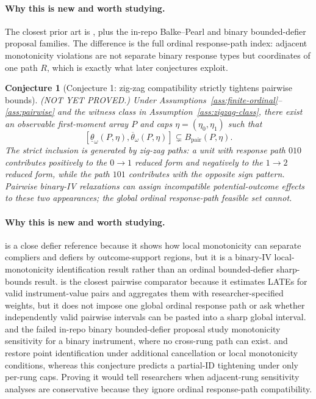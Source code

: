 \documentclass[11pt]{article}
\theoremstyle{definition}
\theoremstyle{plain}
\newtheorem{conjecture}{Conjecture}
\theoremstyle{remark}
\begin{document}
\paragraph{Why this is new and worth studying.}
The closest prior art is \citet{BalkePearl1997}, plus the in-repo Balke--Pearl and binary bounded-defier proposal families.  The difference is the full ordinal response-path index: adjacent monotonicity violations are not separate binary response types but coordinates of one path \(R\), which is exactly what later conjectures exploit.

\begin{conjecture}[Conjecture 1: zig-zag compatibility strictly tightens pairwise bounds]\label{conj:zigzag}
(NOT YET PROVED.)  Under Assumptions~\ref{ass:finite-ordinal}--\ref{ass:pairwise} and the witness class in Assumption~\ref{ass:zigzag-class}, there exist an observable first-moment array \(P\) and caps \(\eta=(\eta_0,\eta_1)\) such that
\[
[\underline\theta_\omega(P,\eta),\overline\theta_\omega(P,\eta)]
\subsetneq B_{\mathrm{pair}}(P,\eta).
\]
The strict inclusion is generated by zig-zag paths: a unit with response path \(010\) contributes positively to the \(0\to1\) reduced form and negatively to the \(1\to2\) reduced form, while the path \(101\) contributes with the opposite sign pattern.  Pairwise binary-IV relaxations can assign incompatible potential-outcome effects to these two appearances; the global ordinal response-path feasible set cannot.
\end{conjecture}
\paragraph{Why this is new and worth studying.}
\citet{HuberMellace2012} is a close defier reference because it shows how local monotonicity can separate compliers and defiers by outcome-support regions, but it is a binary-IV local-monotonicity identification result rather than an ordinal bounded-defier sharp-bounds result.  \citet{SunWuthrich2025} is the closest pairwise comparator because it estimates LATEs for valid instrument-value pairs and aggregates them with researcher-specified weights, but it does not impose one global ordinal response path or ask whether independently valid pairwise intervals can be pasted into a sharp global interval.  \citet{Noack2021} and the failed in-repo binary bounded-defier proposal study monotonicity sensitivity for a binary instrument, where no cross-rung path can exist.  \citet{deChaisemartin2017} and \citet{DahlHuberMellace2023} restore point identification under additional cancellation or local monotonicity conditions, whereas this conjecture predicts a partial-ID tightening under only per-rung caps.  Proving it would tell researchers when adjacent-rung sensitivity analyses are conservative because they ignore ordinal response-path compatibility.
\end{document}
